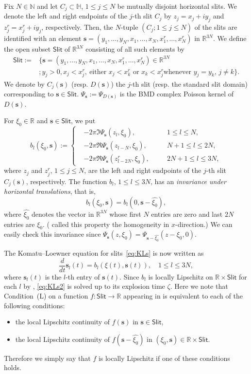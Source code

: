 \documentclass[preprint,12pt]{elsarticle}
\theoremstyle{definition}
\newcommand{\R}{\mathbb{R}}
\newcommand{\N}{\mathbb{N}}
\newcommand{\uhp}{\mathbb{H}}
\newcommand{\Slit}{\mathsf{Slit}}
\newcommand{\slit}{\mathbf{s}}
\begin{document}
Fix $N \in \N$ and
let $C_j \subset \uhp$, $1 \leq j \leq N$ be mutually disjoint horizontal slits.
We denote the left and right endpoints of the $j$-th slit $C_j$ by
$z_j=x_j+iy_j$ and $z^r_j = x^r_j+iy_j$, respectively.
Then, the $N$-tuple $(C_j; 1 \leq j \leq N)$ of the slits
are identified with an element
$\slit=(y_1, \ldots, y_N, x_1, \ldots, x_N, x^r_1, \ldots, x^r_N)$ in $\R^{3N}$.
We define the open subset $\Slit$ of $\R^{3N}$ consisting of all such elements by
\begin{align*}
\Slit:=&\{\slit=(y_1, \ldots, y_N, x_1, \ldots, x_N, x^r_1, \ldots, x^r_N) \in \R^{3N} \\
&; y_j > 0, x_j < x^r_j, \ \text{either $x_j < x^r_k$ or $x_k < x^r_j$
whenever $y_j=y_k$, $j \neq k$}\}.
\end{align*}
We denote by $C_j(\slit)$ (resp.\! $D(\slit)$) the $j$-th slit
(resp.\! the standard slit domain) corresponding to $\slit \in \Slit$.
$\Psi_{\slit}:=\Psi_{D(\slit)}$ is the BMD complex Poisson kernel of $D(\slit)$.

For $\xi_0 \in \R$ and $\slit \in \Slit$, we put
\[
b_l(\xi_0, \slit):=\left\{ \begin{split}
&-2\pi \Im\Psi_{\slit}(z_l, \xi_0), &\quad&1 \leq l \leq N, \\
&-2\pi \Re\Psi_{\slit}(z_{l-N}, \xi_0), &\quad&N+1 \leq l \leq 2N, \\
&-2\pi \Re\Psi_{\slit}(z^r_{l-2N}, \xi_0), &\quad&2N+1 \leq l \leq 3N,
\end{split} \right.
\]
where $z_j$ and $z^r_j$, $1 \leq j \leq N$, are the left and right endpoints
of the $j$-th slit $C_j(\slit)$, respectively.
The function $b_l$, $1 \leq l \leq 3N$, has an \emph{invariance
under horizontal translations}, that is,
\[
b_l(\xi_0, \slit) = b_l(0, \slit -\widehat{\xi_0}),
\]
where $\widehat{\xi_0}$ denotes the vector in $\R^{3N}$
whose first $N$ entries are zero and last $2N$ entries are $\xi_0$.
(\cite{CF18} called this property the homogeneity in $x$-direction.)
We can easily check this invariance since
$\Psi_{\slit}(z, \xi_0)=\Psi_{\slit-\widehat{\xi_0}}(z-\xi_0, 0)$.

The Komatu--Loewner equation for slits~\eqref{eq:KLs} is now written as
\begin{equation} \label{eq:KLs2}
\frac{d}{dt}\slit_l(t)=b_l(\xi(t), \slit(t)), \quad 1 \leq l \leq 3N,
\end{equation}
where $\slit_l(t)$ is the $l$-th entry of $\slit(t)$.
Since $b_l$ is locally Lipschitz on $\R \times \Slit$ for each $l$
by \cite[Lemma~4.1]{CF18},
\eqref{eq:KLs2} is solved up to its explosion time $\zeta$.
Here we note that Condition~(L) on a function $f \colon \Slit \to \R$
appearing in \cite[Lemma~4.1]{CF18}
is equivalent to each of the following conditions:
\begin{itemize}
\item the local Lipschitz continuity of $f(\slit)$ in $\slit \in \Slit$,
\item the local Lipschitz continuity of $f(\slit - \widehat{\xi_0})$
in $(\xi_0, \slit) \in \R \times \Slit$.
\end{itemize}
Therefore we simply say that $f$ is locally Lipschitz
if one of these conditions holds.
\end{document}
